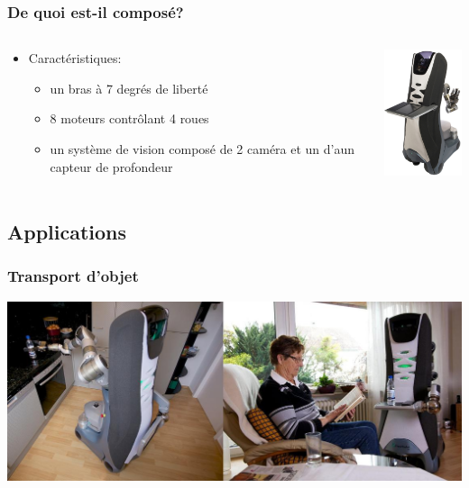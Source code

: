 \begin{frame}
	\frametitle{De quoi est-il composé?}
	\begin{columns}[T]
		\begin{column}{.5\textwidth}
			\begin{itemize}
			\item Caractéristiques:
				\begin{itemize}
				\item un bras à 7 degrés de liberté
				\item 8 moteurs contrôlant 4 roues
				\item un système de vision composé de
                                  2 caméra et un d'aun capteur de
                                  profondeur
				\end{itemize}
			\end{itemize}
		\end{column}
   		\begin{column}{.5\textwidth}
			\includegraphics[width=3cm]{./image/Care_o_bot_3.jpg}
   		\end{column}
	\end{columns}
\end{frame}

\subsection{Applications}
\begin{frame}
	\frametitle{Transport d'objet}
	\includegraphics[scale = 0.36]{./image/Fetch_and_Carry2.JPG}
\end{frame}

